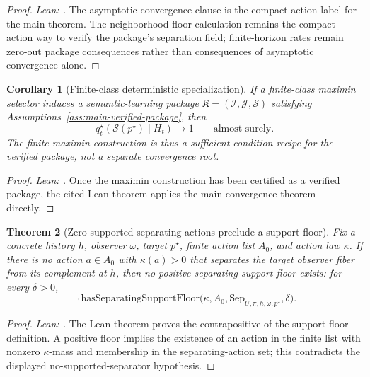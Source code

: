\documentclass[11pt]{article}
\newtheorem{theorem}{Theorem}[section]
\newtheorem{corollary}[theorem]{Corollary}
\theoremstyle{definition}
\theoremstyle{remark}
\theoremstyle{plain}
\theoremstyle{definition}
\newcommand{\Scal}{\mathcal{S}}
\begin{document}
\begin{proof}
\noindent\emph{Lean: .}
The asymptotic convergence clause is the compact-action label for the main theorem. The neighborhood-floor calculation remains the compact-action way to verify the package's separation field; finite-horizon rates remain zero-out package consequences rather than consequences of asymptotic convergence alone.
\end{proof}

\begin{corollary}[Finite-class deterministic specialization]
\label{cor:finite-maximin}
If a finite-class maximin selector induces a semantic-learning package $\mathfrak K=(\mathcal I,\mathcal J,\Scal)$ satisfying Assumptions~\ref{ass:main-verified-package}, then
\[
q_t^\star(\Scal(p^\star)\mid H_t)\to 1
\qquad
\text{almost surely.}
\]
The finite maximin construction is thus a sufficient-condition recipe for the verified package, not a separate convergence root.
\end{corollary}

\begin{proof}
\noindent\emph{Lean: .}
Once the maximin construction has been certified as a verified package, the cited Lean theorem applies the main convergence theorem directly.
\end{proof}

\begin{theorem}[Zero supported separating actions preclude a support floor]
\label{cor:support-necessary}
Fix a concrete history $h$, observer $\omega$, target $p^\star$, finite action list $A_0$, and action law $\kappa$. If there is no action $a\in A_0$ with $\kappa(a)>0$ that separates the target observer fiber from its complement at $h$, then no positive separating-support floor exists: for every $\delta>0$,
\[
\neg\,\mathrm{hasSeparatingSupportFloor}
\bigl(\kappa,A_0,\mathrm{Sep}_{U,\pi,h,\omega,p^\star},\delta\bigr).
\]
\end{theorem}

\begin{proof}
\noindent\emph{Lean: .}
The Lean theorem proves the contrapositive of the support-floor definition. A positive floor implies the existence of an action in the finite list with nonzero $\kappa$-mass and membership in the separating-action set; this contradicts the displayed no-supported-separator hypothesis.
\end{proof}
\end{document}
